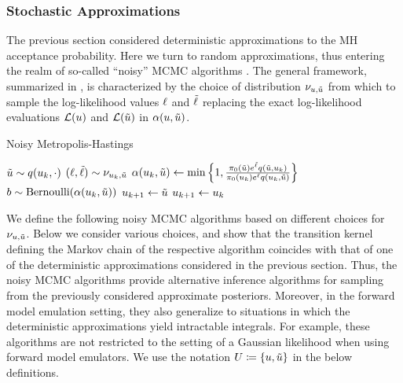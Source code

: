 \documentclass[12pt]{article}
\begin{document}
\subsubsection{Stochastic Approximations}
The previous section considered deterministic approximations to the MH acceptance probability. Here we turn 
to random approximations, thus entering the realm of so-called ``noisy'' MCMC algorithms 
\cite{noisyMCMC, stabilityNoisyMH, noisyMCSurvey, pseudoMarginalMCMC}. The general framework,
summarized in , is characterized by the choice of distribution $\llikSampDist_{\Par, \propPar}$
from which to sample the log-likelihood values $\llikSamp$ and $\llikSampProp$ replacing the exact 
log-likelihood evaluations $\llik(\Par)$ and $\llik(\propPar)$ in $\accProbMH(\Par, \propPar)$.

\begin{algorithm}
    \caption{Noisy Metropolis-Hastings}
    \label{alg:noisy-MH}
    \begin{algorithmic}[1] %
        		\State $\propPar \sim \propDens(\indexMCMC{\Par}, \cdot)$ 
		\State $(\llikSamp, \llikSampProp) \sim \llikSampDist_{\indexMCMC{\Par}, \propPar}$  
		\State $\accProbMH(\indexMCMC{\Par}, \propPar) \gets \min\left\{1, \frac{\priorDens(\propPar)e^{\llikSampProp} 
				\propDens(\propPar, \indexMCMC{\Par})}{\priorDens(\indexMCMC{\Par}) e^{\llikSamp}  \propDens(\indexMCMC{\Par}, \propPar)} \right\}$
		\State $b \sim \text{Bernoulli}(\accProbMH(\indexMCMC{\Par}, \propPar))$
			\State $\indexMCMC[\mcmcIndex+1]{\Par} \gets \propPar$ 
		\Else
			\State $\indexMCMC[\mcmcIndex+1]{\Par} \gets \indexMCMC{\Par}$
		\EndIf
	\EndFor
	\EndFunction
    \end{algorithmic}
\end{algorithm}

We define the following noisy MCMC algorithms based on different choices for $\llikSampDist_{\Par, \propPar}$.
Below we consider various choices, and show that the transition kernel defining the Markov chain of the 
respective algorithm coincides with that of one of the deterministic approximations considered in the previous 
section. Thus, the noisy MCMC algorithms provide alternative inference algorithms for sampling from the previously 
considered approximate posteriors. Moreover, in the forward model emulation setting, they also generalize to 
situations in which the deterministic approximations yield intractable integrals. For example, these algorithms are 
not restricted to the setting of a Gaussian likelihood when using forward model emulators. 
We use the notation $\parMat \Def \{\Par, \propPar\}$ in the below definitions. 
\end{document}
